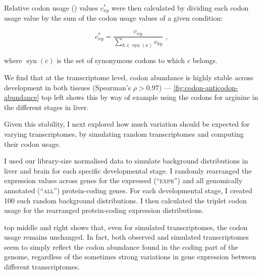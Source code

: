 Relative codon usage (\rcu) values \(c_{xy}^*\) were then calculated by dividing
each codon usage value by the sum of the codon usage values of a given
condition:

\begin{equation}
    c_{xy}^* = \frac{c_{xy}}{\sum_{k\in \operatorname{syn}(x)} c_{ky}} \text{\ ,}
\end{equation}

where \(\operatorname{syn}(c)\) is the set of synonymous codons to which \(c\)
belongs.

We find that at the transcriptome level, codon abundance is highly stable across
development in both tissues (Spearman’s \(\rho > 0.97\)) ---
\cref{fig:codon-anticodon-abundance} top left shows this by way of example using
the codons for arginine in the different stages in liver.

Given this stability, I next explored how much variation should be expected for
varying transcriptomes, by simulating random transcriptomes and computing their
codon usage.

I used our library-size normalised \rnaseq data to simulate background
distributions in liver and brain for each specific developmental stage. I
randomly rearranged the expression values across genes for the expressed
(“\textsc{expr}”) and all genomically annotated (“\textsc{all}”) protein-coding
genes. For each developmental stage, I created \num{100} such random background
distributions. I then calculated the triplet codon usage for the rearranged
protein-coding \rna expression distributions.

 top middle and right shows that, even for
simulated transcriptomes, the codon usage remains unchanged. In fact, both
observed and simulated transcriptomes seem to simply reflect the codon abundance
found in the coding part of the genome, regardless of the sometimes strong
variations in gene expression between different transcriptomes.

